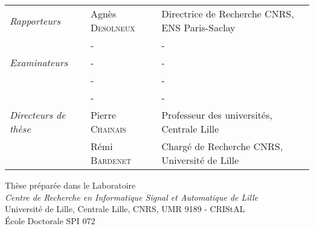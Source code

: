 {{{        \vspace{2em}

        {\begin{minipage}[b]{0.55\linewidth}
          \hspace{-2.5em}
        \end{minipage}
        \hfill
        \begin{minipage}[b]{0.49\linewidth}

        \end{minipage}}

        \vspace{0.5em}

        {\hspace{-3em}
        \begin{tabular}{lll}
        \textit{Rapporteurs}
            &   Agnès {\scshape Desolneux }
            &   Directrice de Recherche CNRS, ENS Paris-Saclay
            \\
            &   -
            &   -\\
        \textit{Examinateurs}
            &   -
            &   -
            \\
            &   -
            &   -
            \\
            &   -
            &   -
            \\
        \textit{Directeurs de thèse}
            &   Pierre {\scshape Chainais}
            &   Professeur des universités, Centrale Lille
            \\
            &   Rémi {\scshape Bardenet}
            &   Chargé de Recherche CNRS, Université de Lille
        \end{tabular}
        }

        \vspace{2em}

        \begin{center}
            {\large Thèse préparée dans le Laboratoire} \\
            {\large \textit{Centre de Recherche en Informatique Signal et Automatique de Lille}\\ Université de Lille, Centrale Lille, CNRS, UMR 9189 - CRIStAL \\
            École Doctorale SPI 072}
        \end{center}

}}}
